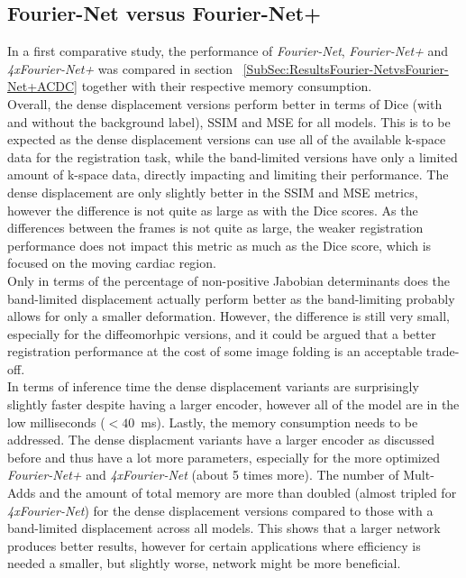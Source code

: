 \subsection{Fourier-Net versus Fourier-Net+} \label{SubSec:DiscussionFourier-NetvsFourier-Net+ACDC}
In a first comparative study, the performance of \emph{Fourier-Net}, \emph{Fourier-Net+} and \emph{4xFourier-Net+} was compared in section ~\ref{SubSec:ResultsFourier-NetvsFourier-Net+ACDC} together with their respective memory consumption.\\
Overall, the dense displacement versions perform better in terms of Dice (with and without the background label), SSIM and MSE for all models. This is to be expected as the dense displacement versions can use all of the available k-space data for the registration task, while the band-limited versions have only a limited amount of k-space data, directly impacting and limiting their performance. The dense displacement are only slightly better in the SSIM and MSE metrics, however the difference is not quite as large as with the Dice scores. As the differences between the frames is not quite as large, the weaker registration performance does not impact this metric as much as the Dice score, which is focused on the moving cardiac region.\\
Only in terms of the percentage of non-positive Jabobian determinants does the band-limited displacement actually perform better as the band-limiting probably allows for only a smaller deformation. However, the difference is still very small, especially for the diffeomorhpic versions, and it could be argued that a better registration performance at the cost of some image folding is an acceptable trade-off. \\
In terms of inference time the dense displacement variants are surprisingly slightly faster despite having a larger encoder, however all of the model are in the low milliseconds ($<40$~ms). Lastly, the memory consumption needs to be addressed. The dense displacment variants have a larger encoder as discussed before and thus have a lot more parameters, especially for the more optimized \emph{Fourier-Net+} and \emph{4xFourier-Net} (about 5 times more). The number of Mult-Adds and the amount of total memory are more than doubled (almost tripled for \emph{4xFourier-Net}) for the dense displacement versions compared to those with a band-limited displacement across all models. This shows that a larger network produces better results, however for certain applications where efficiency is needed a smaller, but slightly worse, network might be more beneficial.


